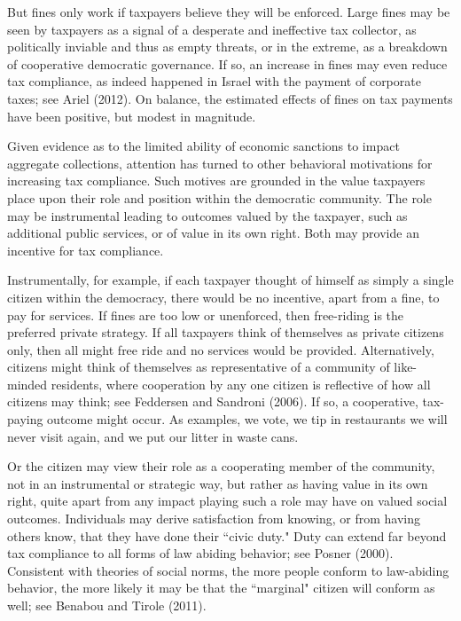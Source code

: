 \documentclass[12pt,titlepage]{article}
\begin{document}
But fines only work if
taxpayers believe they will be enforced.  Large fines may be seen by
taxpayers as a signal of a desperate and ineffective tax collector, as
politically inviable and thus as empty threats, or in the extreme,
as a breakdown of cooperative democratic governance.  If so, an
increase in fines may even reduce tax compliance, as indeed happened
in Israel with the payment of corporate taxes; see Ariel (2012).  On
balance, the estimated effects of fines on tax payments have been
positive, but modest in magnitude.

Given evidence as to the limited ability of economic sanctions to
impact aggregate collections, attention has turned to 
other  behavioral motivations for increasing tax
compliance.  Such motives are grounded in the value taxpayers place
upon their role and position within the democratic community.  The
role may be instrumental leading to outcomes valued by the taxpayer,
such as additional public services, or of value in its own right.
Both may provide an incentive for tax compliance.

Instrumentally, for example, if each taxpayer thought of himself as
simply a single citizen within the democracy, there would be no
incentive, apart from a fine, to pay for services.  If fines are too
low or unenforced, then free-riding is the preferred private strategy.
If all taxpayers think of themselves as private citizens only, then all
might free ride and no services would be provided.   Alternatively,
citizens might think of themselves as representative of a community
of like-minded residents, where cooperation by any one citizen is
reflective of how all citizens may think; see Feddersen and Sandroni
(2006).  If so, a cooperative, tax-paying outcome might occur. 
As examples, we vote, we tip in restaurants we will never visit again,
and we put our litter in waste cans.

Or the citizen may view their role as a cooperating member of the 
community, not in an instrumental or strategic way, but rather as 
having value in its own right, quite apart from any impact playing such a role may have on valued
social outcomes.  Individuals may derive satisfaction from knowing, or
from having others know, that they have done their ``civic duty."
Duty can extend far beyond tax compliance to all forms of law abiding
behavior; see Posner (2000).  Consistent with theories of social
norms, the more people conform to law-abiding behavior, the more
likely it may be that the ``marginal" citizen will conform as well;
see Benabou and Tirole (2011).
\end{document}
